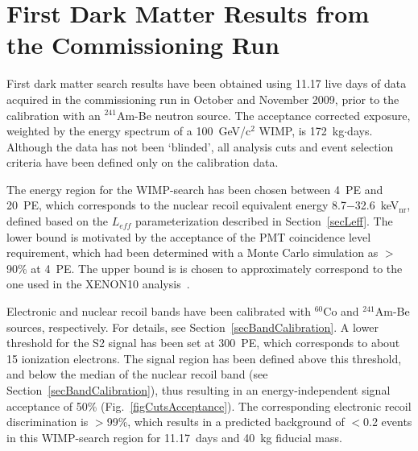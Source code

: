 \section{First Dark Matter Results from the Commissioning Run}
\label{secRun07}

First dark matter search results have been obtained using 11.17 live days of data acquired in the commissioning run in October and November 2009, prior to the calibration with an $^{241}$Am-Be neutron source. The acceptance corrected exposure, weighted by the energy spectrum of a 100~GeV/c$^{2}$ WIMP, is 172~kg$\cdot$days. Although the data has not been `blinded', all analysis cuts and event selection criteria have been defined only on the calibration data.

The energy region for the WIMP-search has been chosen between 4~PE and 20~PE, which corresponds to the nuclear recoil equivalent energy 8.7$-$32.6~keV$_{\mathrm{nr}}$, defined based on the $L_{eff}$ parameterization described in Section~\ref{secLeff}. 
The lower bound is motivated by the acceptance of the PMT coincidence level requirement, which had been determined with a Monte Carlo simulation as $>$90\% at 4~PE. The upper bound is is chosen to approximately correspond to the one used in the XENON10 analysis~\cite{xe10-independent}.

Electronic and nuclear recoil bands have been calibrated with $^{60}$Co and $^{241}$Am-Be sources, respectively. For details, see Section~\ref{secBandCalibration}. 
A lower threshold for the S2 signal has been set at 300~PE, which corresponds to about 15 ionization electrons. The signal region has been defined above this threshold, and below the median of the nuclear recoil band (see Section~\ref{secBandCalibration}), thus resulting in an energy-independent signal acceptance of 50\% (Fig.~\ref{figCutsAcceptance}). The corresponding electronic recoil discrimination is $>$99\%, which results in a predicted background of $<$0.2 events in this WIMP-search region for 11.17~days and 40~kg fiducial mass.

